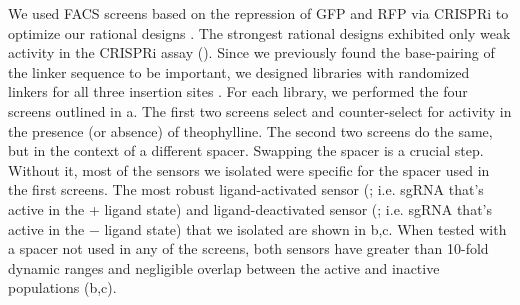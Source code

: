 \documentclass[10pt,oneside]{article}
\begin{document}
We used FACS screens based on the repression of GFP and RFP via CRISPRi to optimize our rational designs \invivo{}.  The strongest rational designs exhibited only weak activity in the CRISPRi assay ().  Since we previously found the base-pairing of the linker sequence to be important, we designed libraries with randomized linkers for all three insertion sites .  For each library, we performed the four screens outlined in a.  The first two screens select and counter-select for activity in the presence (or absence) of theophylline.  The second two screens do the same, but in the context of a different spacer.  Swapping the spacer is a crucial step.  Without it, most of the sensors we isolated were specific for the spacer used in the first screens.  The most robust ligand-activated sensor (\ligrnaF{}; i.e. sgRNA that's active in the + ligand state) and ligand-deactivated sensor (\ligrnaB{}; i.e. sgRNA that's active in the − ligand state) that we isolated are shown in b,c.  When tested with a spacer not used in any of the screens, both sensors have greater than 10-fold dynamic ranges and negligible overlap between the active and inactive populations (b,c).
% 
% 
% 
%
\end{document}
